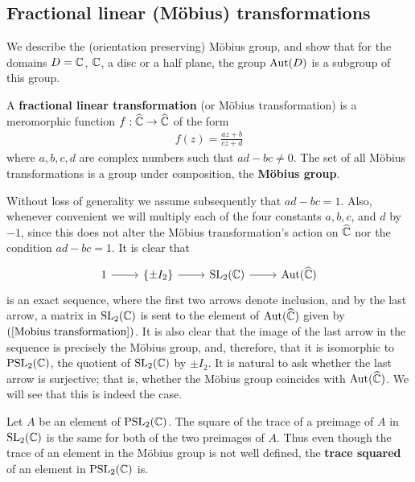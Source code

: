 \subsection{Fractional linear (M\"obius) transformations}
We describe the (orientation preserving) M\"obius group, and show that for the domains $D=\mathbb{C}$, $\mathbb{C}$, a disc or a half plane, the group $\mathrm{Aut}(D)$ is a subgroup of this group.
\begin{definition}
A \textbf{fractional linear transformation} (or M\"obius transformation) is a meromorphic function $f:\widehat{\mathbb{C}}\to\widehat{\mathbb{C}}$ of the form
\begin{align}\label{Mobius transformation}
f(z)=\frac{az+b}{cz+d}
\end{align}
where $a,b,c,d$ are complex numbers such that $ad-bc\neq 0$. The set of all M\"obius transformations is a group under composition, the \textbf{M\"obius group}.
\end{definition}
Without loss of generality we assume subsequently that $ad-bc=1$. Also, whenever convenient we will multiply each of the four constants $a,b,c$, and $d$ by $-1$, since this does not alter the M\"obius transformation's action on $\widehat{\mathbb{C}}$ nor the condition $ad-bc=1$. It is clear that
\begin{equation}\label{exact sequence of Mobious transform}
\begin{tikzcd}
1\ar[r]&\{\pm I_2\}\ar[r]&\SL_2(\C)\ar[r]&\Aut(\widehat{\C})
\end{tikzcd}
\end{equation}
is an exact sequence, where the first two arrows denote inclusion, and by the last arrow, a matrix in $\mathrm{SL}_2(\mathbb{C})$ is sent to the element of $\mathrm{Aut}(\widehat{\mathbb{C}})$ given by $(\ref{Mobius transformation})$. It is also clear that the image of the last arrow in the sequence is precisely the M\"obius group, and, therefore, that it is isomorphic to $\mathrm{PSL}_2(\mathbb{C})$, the quotient of $\mathrm{SL}_2(\mathbb{C})$ by $\pm I_2$. It is natural to ask whether the last arrow is surjective; that is, whether the M\"obius group coincides with $\mathrm{Aut}(\widehat{\mathbb{C}})$. We will see that this is indeed the case.\par
Let $A$ be an element of $\mathrm{PSL}_2(\mathbb{C})$. The square of the trace of a preimage of $A$ in $\mathrm{SL}_2(\mathbb{C})$ is the same for both of the two preimages of $A$. Thus even though the trace of an element in the M\"obius group is not well defined, the \textbf{trace squared} of an element in $\mathrm{PSL}_2(\mathbb{C})$ is.
